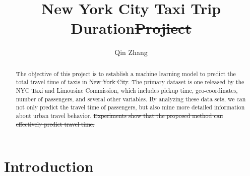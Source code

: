 \documentclass{amsart}
\providecommand{\DIFadd}[1]{{\protect\color{blue}\uwave{#1}}} %
\providecommand{\DIFdel}[1]{{\protect\color{red}\sout{#1}}}                      %
\providecommand{\DIFaddbegin}{} %
\providecommand{\DIFaddend}{} %
\providecommand{\DIFdelbegin}{} %
\providecommand{\DIFdelend}{} %
\begin{document}
%
%
\title[A Short Running Title]{New York City Taxi Trip Duration\DIFdelbegin \DIFdel{Projiect}\DIFdelend }%

\author{Qin Zhang}
\address[A.~1]{School of Computer Science,\\ 
Chongqing Technology and Business University}%






%
\date{\gitAuthorDate}%


\begin{abstract}
The objective of this project is to establish a machine learning model to predict the total travel time of taxis in \DIFdelbegin \DIFdel{New York City}\DIFdelend \DIFaddbegin \DIFadd{NY}\DIFaddend . The primary dataset is one released by the NYC Taxi and Limousine Commission, which includes pickup time, geo-coordinates, number of passengers, and several other variables. By analyzing these data sets, we can not only predict the travel time of passengers, but also mine more detailed information about urban travel behavior. 
\DIFdelbegin \DIFdel{Experiments show that the proposed method can effectively predict travel time.
}\DIFdelend \end{abstract}

%



\maketitle
\tableofcontents

\newpage

\section{Introduction}\label{sec-intro}





\end{document}

